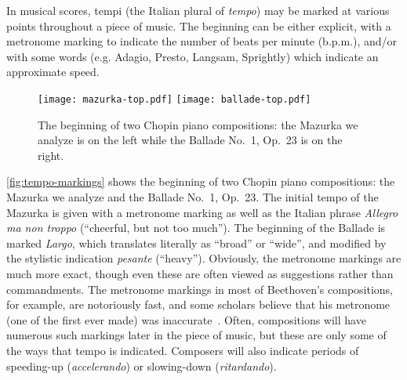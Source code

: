 \documentclass[12pt]{article}
\begin{document}
In musical scores, tempi (the Italian plural of {\em tempo}) may be
marked at various points throughout a piece of music. The
beginning can be either explicit, with a metronome marking to
indicate the number of beats per minute (b.p.m.), and/or with some words
(e.g. Adagio, Presto, Langsam, Sprightly) which indicate an
approximate speed. 
\begin{figure}[t!]
  \centering
  \texttt{[image: mazurka-top.pdf]}
  \texttt{[image: ballade-top.pdf]}
  \caption{The beginning of two Chopin piano compositions: the Mazurka
    we analyze is on the left while the Ballade No.\ 1, Op.\ 23 is on
    the right.}
  \label{fig:tempo-markings}
\end{figure}
\autoref{fig:tempo-markings} shows the beginning of two Chopin piano
compositions: the Mazurka we analyze and the Ballade No.\ 1, Op.\ 23. The initial tempo of the Mazurka is given with a metronome
marking as well as the Italian phrase {\em Allegro ma non troppo}
(``cheerful, but not too much''). The beginning of the Ballade is 
marked {\em Largo}, which translates literally as ``broad'' or
``wide'', and modified by the stylistic indication {\em pesante}
(``heavy''). Obviously, the metronome markings are much more exact,
though even these are often viewed as suggestions rather than
commandments. The metronome markings in most of Beethoven's
compositions, for example, are notoriously fast, and some scholars
believe that his metronome (one of the first ever made) was
inaccurate~\citep{ForsenGray2013}. Often, compositions will have numerous such markings later
in the piece of music, but these are only some of the ways that tempo
is indicated. Composers will also indicate periods of speeding-up
(\emph{accelerando}) or
slowing-down (\emph{ritardando}).
\end{document}
